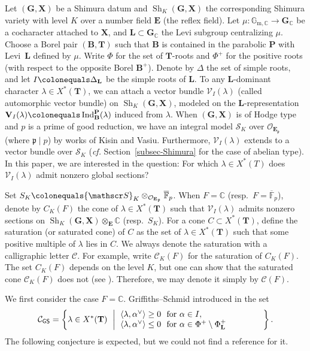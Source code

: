 \documentclass[11pt]{amsart}
\numberwithin{equation}{section}
\theoremstyle{definition}
\theoremstyle{remark}
\newcommand{\GSsf}{\mathsf{GS}}
\newcommand{\Ccal}{{\mathcal C}}
\newcommand{\Ocal}{{\mathcal O}}
\newcommand{\Vcal}{{\mathcal V}}
\newcommand{\pfr}{{\mathfrak p}}
\newcommand{\CC}{\mathbb{C}}
\newcommand{\FF}{\mathbb{F}}
\newcommand{\GG}{\mathbb{G}}
\newcommand{\Sscr}{{\mathscr S}}
\DeclareMathOperator{\Sh}{Sh}
\newcommand{\cf}{{\em cf. }}
\DeclareMathOperator{\Ind}{Ind}
\newcommand{\relmiddle}[1]{\mathrel{}\middle#1\mathrel{}}
\begin{document}
Let $(\mathbf{G},\mathbf{X})$ be a Shimura datum and $\Sh_K(\mathbf{G},\mathbf{X})$ the corresponding Shimura variety with level $K$ over a number field $\mathbf{E}$ (the reflex field). Let $\mu\colon \GG_{\mathrm{m},\CC}\to \mathbf{G}_{\CC}$ be a cocharacter attached to $\mathbf{X}$, and $\mathbf{L}\subset \mathbf{G}_\CC$ the Levi subgroup centralizing $\mu$. Choose a Borel pair $(\mathbf{B},\mathbf{T})$ such that $\mathbf{B}$ is contained in the parabolic $\mathbf{P}$ with Levi~$\mathbf{L}$ defined by $\mu$. Write $\Phi$ for the set of $\mathbf{T}$-roots and $\Phi^+$ for the positive roots (with respect to the opposite Borel $\mathbf{B}^+$). Denote by $\Delta$ the set of simple roots, and let $I\colonequals \Delta_{\mathbf{L}}$ be the simple roots of $\mathbf{L}$. To any $\mathbf{L}$-dominant character $\lambda\in X^*(\mathbf{T})$, we can attach a vector bundle $\Vcal_I(\lambda)$ (called automorphic vector bundle) on $\Sh_K(\mathbf{G},\mathbf{X})$, modeled on the $\mathbf{L}$-representation $\mathbf{V}_I(\lambda)\colonequals \Ind_{\mathbf{B}}^{\mathbf{P}}(\lambda)$ induced from $\lambda$.
When $(\mathbf{G},\mathbf{X})$ is of Hodge type and $p$ is a prime of good reduction, we have an integral model $\Sscr_K$ over $\Ocal_{\mathbf{E}_\pfr}$ (where $\pfr\mid p$) by works of Kisin and Vasiu. Furthermore, $\Vcal_I(\lambda)$ extends to a vector bundle over $\Sscr_K$ (\cf Section~\ref{subsec-Shimura} for the case of abelian type). In this paper, we are interested in the question: For which $\lambda\in X^*(T)$ does $\Vcal_I(\lambda)$ admit nonzero global sections?

Set $S_K\colonequals \Sscr_K\otimes_{\Ocal_{\mathbf{E}_\pfr}}\overline{\FF}_p$. When $F=\CC$ (resp.~$F=\overline{\FF}_p$), denote by $C_K(F)$ the cone of $\lambda\in X^*(\mathbf{T})$ such that $\Vcal_I(\lambda)$ admits nonzero sections on $\Sh_K(\mathbf{G},\mathbf{X}) \otimes_{\mathbf{E}} \CC$ (resp.~$S_K$). 
For a cone $C\subset X^*(\mathbf{T})$, define the saturation (or saturated cone) of $C$ as the set of $\lambda\in X^*(\mathbf{T})$ such that some positive multiple of $\lambda$ lies in $C$. We always denote the saturation with a calligraphic letter $\Ccal$. For example, write $\Ccal_K(F)$ for the saturation of $C_K(F)$. The set $C_K(F)$ depends on the level $K$, but one can show that the saturated cone $\Ccal_K(F)$ does not (see \cite[Corollary 1.5.3]{Koskivirta-automforms-GZip}). Therefore, we may denote it simply by $\Ccal(F)$.

We first consider the case $F=\CC$. Griffiths--Schmid introduced in \cite{Griffiths-Schmid-homogeneous-complex-manifolds} the set 
\begin{equation}
\Ccal_{\GSsf}=\left\{ \lambda\in X^{*}(\mathbf{T}) \ \relmiddle| \ 
\parbox{6cm}{
$\langle \lambda, \alpha^\vee \rangle \geq 0 \ \textrm{ for }\alpha\in I, \\
\langle \lambda, \alpha^\vee \rangle \leq 0 \ \textrm{ for }\alpha\in \Phi^+ \setminus \Phi_{\mathbf{L}}^{+}$}
\right\}.
\end{equation}
The following conjecture is expected, but we could not find a reference for it.
\end{document}

